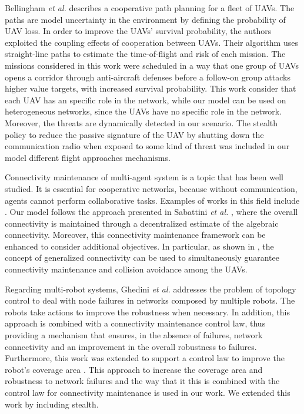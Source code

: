 Bellingham \textit{et al. } \cite{bellingham_2002} describes a cooperative path planning for a fleet of UAVs. The paths are model uncertainty in the environment by defining the probability of UAV loss. In order to improve the UAVs' survival probability, the authors exploited the coupling effects of cooperation between UAVs. Their algorithm uses straight-line paths to estimate the time-of-flight and risk of each mission. The missions considered in this work were scheduled in a way that one group of UAVs opens a corridor through anti-aircraft defenses before a follow-on group attacks higher value targets, with increased survival probability. This work consider that each UAV has an specific role in the network, while our model can be used on heterogeneous networks, since the UAVs have no specific role in the network. Moreover, the threats are dynamically detected in our scenario. The stealth policy to reduce the passive signature of the UAV by shutting down the communication radio when exposed to some kind of threat was included in our model different flight approaches mechanisms.


Connectivity maintenance of multi-agent system is a topic that has been well studied. It is essential for cooperative networks, because without  communication, agents cannot perform collaborative tasks. Examples of works in this field include \cite{ji_2007, dimarogonas_2010, morbidi_2010}. Our model follows the approach presented in Sabattini \textit{et al.} \cite{sabattiniijrr2013}, where the overall connectivity is maintained through a decentralized estimate of the algebraic connectivity. Moreover, this connectivity maintenance framework can be enhanced to consider additional objectives. In particular, as shown in \cite{Lee13tmech}, the concept of generalized connectivity can be used to simultaneously guarantee connectivity maintenance and collision avoidance among the UAVs.

Regarding multi-robot systems, Ghedini \textit{et al.} \cite{ghedini_2016_dars} addresses the problem of topology control to deal with node failures in networks composed by multiple robots. The robots take actions to improve the robustness when necessary. In addition, this approach is combined with a connectivity maintenance control law, thus providing a mechanism that ensures, in the absence of failures, network connectivity and an improvement in the overall robustness to failures. Furthermore, this work was extended to support a control law to improve the robot's coverage area \cite{ghedini_2017}. This approach to increase the coverage area and robustness to network failures and the way that it this is combined with the control law for connectivity maintenance is used in our work. We extended this work by including stealth.

